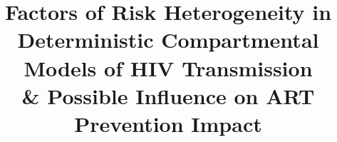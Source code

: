 \documentclass[10pt]{article}
\title{
  Factors of Risk Heterogeneity in\\
  Deterministic Compartmental Models of HIV Transmission\\
  \& Possible Influence on ART Prevention Impact
}
\begin{document}
  \maketitle
  \begin{landscape}
    
  \end{landscape}
\end{document}
